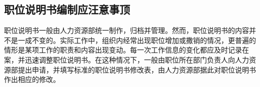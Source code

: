     \subsection {职位说明书编制应汪意事顶}

    职位说明书一般由人力资源部统一制作，归档并管理。然而，职位说明书的内容并不是一成不变的。实际工作中，组织内经常出现职位增加或撒销的情况，更普遍的情形是某项工作的职责和内容出现变动。每一次工作信息的变化都应及时记录在案，并迅速调整职位说明书。在这种情况下，一般由职位所在部门负责人向人力资源部提出申请，并填写标准的职位说明书修改表，由人力资源部据此对职位说明书作出相应的修改。

